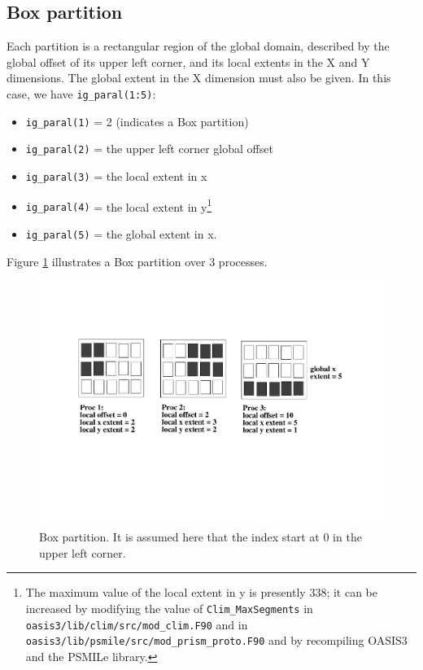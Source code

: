 \subsection{Box partition} 

Each partition is a rectangular region of the global domain, described
by the global offset of its upper left corner, and its local extents in the
X and Y dimensions. The global extent in the X dimension must also be
given. In this case, we have {\tt ig\_paral(1:5)}:
\begin{itemize}
 \item {\tt ig\_paral(1)} = 2 (indicates a Box partition)
 \item {\tt ig\_paral(2)} = the upper left corner global offset
 \item {\tt ig\_paral(3)} = the local extent in x
 \item {\tt ig\_paral(4)} = the local extent in y\footnote{The maximum
value of the local extent in y is presently 338; it can be increased
by modifying the value of {\tt Clim\_MaxSegments} in {\tt
oasis3/lib/clim/src/mod\_clim.F90} and in {\tt
oasis3/lib/psmile/src/mod\_prism\_proto.F90} and by recompiling
OASIS3 and the PSMILe library.}
 \item {\tt ig\_paral(5)} = the global extent in x.
\end{itemize}

Figure \ref{box_partition} illustrates a Box partition over 3
processes.  
 
\begin{figure}
\includegraphics[scale=.6]{figures/box_new} 
\caption{Box partition. It is assumed here that the index start at 0 in the upper left corner.}
\label{box_partition}
\end{figure} 
  

